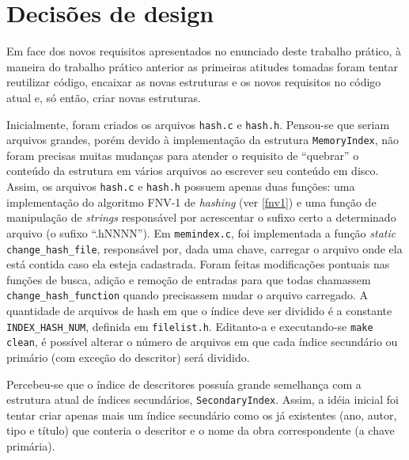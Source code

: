 \documentclass[a4paper,10pt]{article}
\begin{document}
\section{Decisões de design}\label{designdecisions}
Em face dos novos requisitos apresentados no enunciado deste trabalho prático, à maneira do trabalho prático anterior as primeiras atitudes tomadas foram tentar reutilizar código, encaixar as novas estruturas e os novos requisitos no código atual e, só então, criar novas estruturas.

Inicialmente, foram criados os arquivos \texttt{hash.c} e \texttt{hash.h}. Pensou-se que seriam arquivos grandes, porém devido à implementação da estrutura \texttt{MemoryIndex}, não foram precisas muitas mudanças para atender o requisito de ``quebrar'' o conteúdo da estrutura em vários arquivos ao escrever seu conteúdo em disco. Assim, os arquivos \texttt{hash.c} e \texttt{hash.h} possuem apenas duas funções: uma implementação do algoritmo FNV-1 de \textit{hashing} (ver \ref{fnv1}) e uma função de manipulação de \textit{strings} responsável por acrescentar o sufixo certo a determinado arquivo (o sufixo ``.hNNNN''). Em \texttt{memindex.c}, foi implementada a função \textit{static} \texttt{change\_hash\_file}, responsável por, dada uma chave, carregar o arquivo onde ela está contida caso ela esteja cadastrada. Foram feitas modificações pontuais nas funções de busca, adição e remoção de entradas para que todas chamassem \texttt{change\_hash\_function} quando precisassem mudar o arquivo carregado. A quantidade de arquivos de hash em que o índice deve ser dividido é a constante \texttt{INDEX\_HASH\_NUM}, definida em \texttt{filelist.h}. Editanto-a e executando-se \texttt{make clean}, é possível alterar o número de arquivos em que cada índice secundário ou primário (com exceção do descritor) será dividido.

Percebeu-se que o índice de descritores possuía grande semelhança com a estrutura atual de índices secundários, \texttt{SecondaryIndex}. Assim, a idéia inicial foi tentar criar apenas mais um índice secundário como os já existentes (ano, autor, tipo e título) que conteria o descritor e o nome da obra correspondente (a chave primária).
\end{document}
